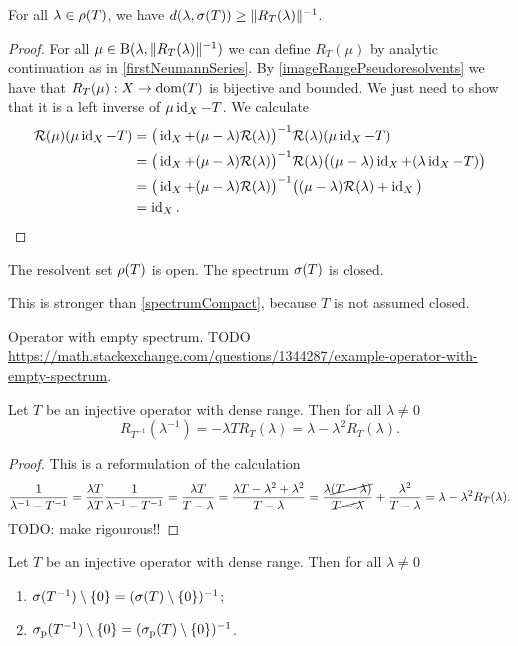\begin{proposition} \label{resolventNormDistanceToSpectrum}
For all $\lambda\in\rho(T)$, we have $d(\lambda, \sigma(T)) \geq \lVert R_T(\lambda)\rVert^{-1}$.
\end{proposition}
\begin{proof}
For all $\mu\in \operatorname{B}(\lambda, \lVert R_T(\lambda)\rVert^{-1})$ we can define $R_T(\mu)$ by analytic continuation as in \ref{firstNeumannSeries}. By \ref{imageRangePseudoresolvents} we have that $R_T(\mu): X\to \operatorname{dom}(T)$ is bijective and bounded. We just need to show that it is a left inverse of $\mu\operatorname{id}_X - T$. We calculate
\begin{align*}
\mathcal{R}(\mu)(\mu\operatorname{id}_X - T) &= \big(\operatorname{id}_X + (\mu - \lambda)\mathcal{R}(\lambda)\big)^{-1}\mathcal{R}(\lambda)(\mu\operatorname{id}_X - T) \\
&= \big(\operatorname{id}_X + (\mu - \lambda)\mathcal{R}(\lambda)\big)^{-1}\mathcal{R}(\lambda)\big((\mu - \lambda)\operatorname{id}_X + (\lambda\operatorname{id}_X - T)\big) \\
&= \big(\operatorname{id}_X + (\mu - \lambda)\mathcal{R}(\lambda)\big)^{-1}\big((\mu - \lambda)\mathcal{R}(\lambda) + \operatorname{id}_X\big) \\
&= \operatorname{id}_X.
\end{align*}
\end{proof}
\begin{corollary}
The resolvent set $\rho(T)$ is open. The spectrum $\sigma(T)$ is closed.
\end{corollary}
This is stronger than \ref{spectrumCompact}, because $T$ is not assumed closed.


\begin{example}
Operator with empty spectrum. TODO \url{https://math.stackexchange.com/questions/1344287/example-operator-with-empty-spectrum}.
\end{example}

\begin{proposition}
Let $T$ be an injective operator with dense range. Then for all $\lambda\neq 0$
\[ R_{T^{-1}}(\lambda^{-1}) = -\lambda T R_{T}(\lambda) = \lambda -\lambda^2 R_T(\lambda). \]
\end{proposition}
\begin{proof}
This is a reformulation of the calculation
\[ \frac{1}{\lambda^{-1} - T^{-1}} = \frac{\lambda T}{\lambda T}\frac{1}{\lambda^{-1} - T^{-1}} = \frac{\lambda T}{T - \lambda} = \frac{\lambda T - \lambda^2 + \lambda^2}{T - \lambda} = \frac{\lambda\cancel{(T - \lambda)}}{\cancel{T - \lambda}} + \frac{\lambda^2}{T - \lambda} = \lambda - \lambda^2 R_T(\lambda). \]
TODO: make rigourous!!
\end{proof}
\begin{corollary}
Let $T$ be an injective operator with dense range. Then for all $\lambda\neq 0$
\begin{enumerate}
\item $\sigma(T^{-1})\setminus\{0\} = (\sigma(T)\setminus \{0\})^{-1}$;
\item $\sigma_\text{p}(T^{-1})\setminus\{0\} = (\sigma_\text{p}(T)\setminus \{0\})^{-1}$.
\end{enumerate}
\end{corollary}


